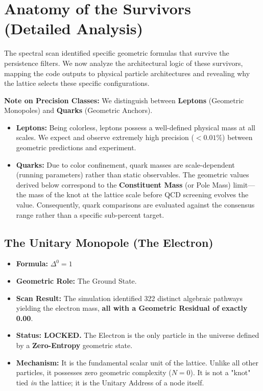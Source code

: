 \section{Anatomy of the Survivors (Detailed Analysis)}

The spectral scan identified specific geometric formulas that survive the persistence filters. We now analyze the architectural logic of these survivors, mapping the code outputs to physical particle architectures and revealing why the lattice selects these specific configurations.

\textbf{Note on Precision Classes:} We distinguish between \textbf{Leptons} (Geometric Monopoles) and \textbf{Quarks} (Geometric Anchors).

\begin{itemize}
    \item \textbf{Leptons:} Being colorless, leptons possess a well-defined physical mass at all scales. We expect and observe extremely high precision ($< 0.01\%$) between geometric predictions and experiment.
    \item \textbf{Quarks:} Due to color confinement, quark masses are scale-dependent (running parameters) rather than static observables. The geometric values derived below correspond to the \textbf{Constituent Mass} (or Pole Mass) limit—the mass of the knot at the lattice scale before QCD screening evolves the value. Consequently, quark comparisons are evaluated against the consensus range rather than a specific sub-percent target.
\end{itemize}

\subsection*{The Unitary Monopole (The Electron)}
\begin{itemize}
    \item \textbf{Formula:} $\Delta^0 = 1$
    \item \textbf{Geometric Role:} The Ground State.
    \item \textbf{Scan Result:} The simulation identified 322 distinct algebraic pathways yielding the electron mass, \textbf{all with a Geometric Residual of exactly 0.00}.
    \item \textbf{Status: LOCKED.} The Electron is the only particle in the universe defined by a \textbf{Zero-Entropy} geometric state.
    \item \textbf{Mechanism:} It is the fundamental scalar unit of the lattice. Unlike all other particles, it possesses zero geometric complexity ($N=0$). It is not a "knot" tied \textit{in} the lattice; it is the Unitary Address of a node itself.
\end{itemize}

